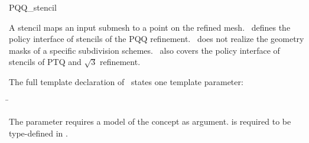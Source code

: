 
\ccRefPageBegin



\begin{ccRefClass}{PQQ_stencil}

\ccDefinition

A stencil maps an input submesh to a point on the refined 
mesh. \ccClassTemplateName\ defines the policy interface of 
stencils of the PQQ refinement. \ccClassTemplateName\ does not
realize the geometry masks of a specific subdivision schemes.
\ccClassTemplateName\ also covers the policy interface 
of stencils of PTQ and $\sqrt{3}$ refinement.




\ccParameters

The full template declaration of \ccClassTemplateName\ states one
template parameter:

\begin{tabbing}
 \= 
\end{tabbing}
   
The  parameter requires a model of 
the  concept as argument.  
is required to be type-defined in .


\end{ccRefClass}

